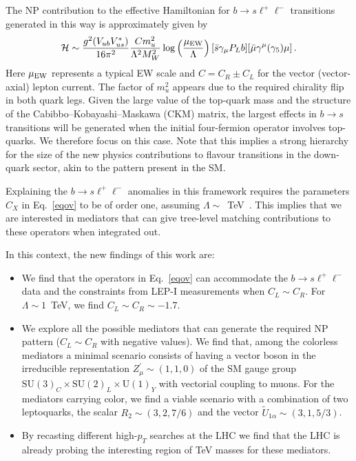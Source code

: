 \documentclass[aps,twocolumn,showpacs,preprintnumbers,amsmath,amssymb,floatfix,nofootinbib]{revtex4-1}
\begin{document}
The NP contribution to the effective Hamiltonian for $b \to s \ell^+ \ell^-$ transitions generated in this way is approximately given by 
 \begin{align*}
\mathcal{H} \sim\frac{g^2 (  V_{ub}  V_{us}^* )}{16 \pi^2}   \frac{C m_u^2}{\Lambda^2 M_W^2}   \, \mathrm{log}\left( \frac{\mu_{\rm{EW}}}{\Lambda} \right)   [\bar s \gamma_{\mu}   P_L  b ][ \bar \mu \gamma^{\mu} (\gamma_5) \mu ] \,.
 \end{align*}
Here $\mu_{\rm{EW}}$ represents a typical EW scale and $C = C_R \pm C_L$ for the vector (vector-axial) lepton current.  The factor of $m_u^2$ appears due to the required chirality flip in both quark legs.   Given the large value of the top-quark mass and the structure of the Cabibbo--Kobayashi--Maskawa (CKM) matrix, the largest effects in $b \to s$ transitions will be generated when the initial four-fermion operator involves top-quarks.   We therefore focus on this case.  Note that this implies a strong hierarchy for the size of the new physics contributions to flavour transitions in the down-quark sector, akin to the pattern present in the SM.    





Explaining the $b \to s \ell^+ \ell^-$ anomalies in this framework requires the parameters $C_{X}$ in Eq.~\eqref{eqov} to be of order one, assuming $\Lambda \sim$~TeV~\cite{Celis:2017doq}.  This implies that we are interested in mediators that can give tree-level matching contributions to these operators when integrated out.  



 

In this context, the new findings of this work are:
%
\begin{itemize}
\item  We find that the operators in Eq.~\eqref{eqov} can accommodate the $b \to s \ell^+ \ell^-$ data and the constraints from LEP-I measurements when $C_L \sim C_R$.     For $\Lambda \sim 1$~TeV, we find $C_L \sim C_R \sim -1.7$.
\item We explore all the possible mediators that can generate the required NP pattern ($C_L \sim C_R$ with negative values).     We find that, among the colorless mediators a minimal scenario consists of having a vector boson in the irreducible representation $Z_{\mu}^{\prime} \sim (1,1,0)$ of the SM gauge group $\mathrm{SU(3)}_C \times \mathrm{SU(2)}_L \times \mathrm{U(1)}_Y$ with vectorial coupling to muons.  For the mediators carrying color,  we find a viable scenario with a combination of two leptoquarks, the scalar $R_2 \sim (3,2,7/6)$ and the vector $\widetilde U_{1 \alpha} \sim (3,1,5/3)$.
\item By recasting different high-$p_T$ searches at the LHC we find that the LHC is already probing the interesting region of TeV masses for these mediators.
\end{itemize}
%
 
\end{document}
